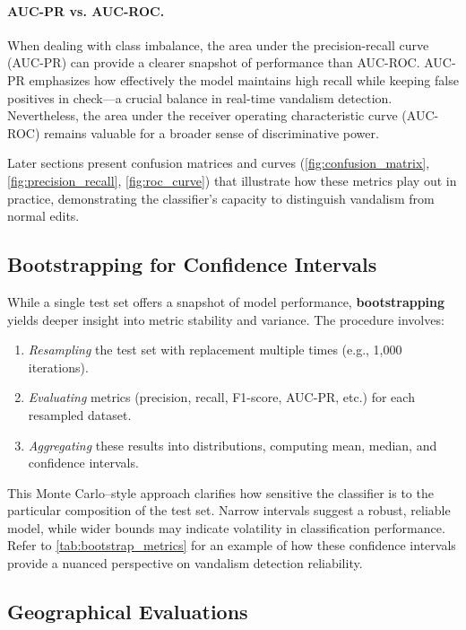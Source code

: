\documentclass[
    13pt, %
    a4paper, %
    DIV14, %
    listof=totoc, %
    bibliography=totoc, %
    index=totoc, %
    headsepline
]{scrreprt}
\begin{document}
\paragraph{AUC-PR vs. AUC-ROC.}
\noindent
When dealing with class imbalance, the area under the precision-recall curve (AUC-PR) can provide a clearer snapshot of performance than AUC-ROC. AUC-PR emphasizes how effectively the model maintains high recall while keeping false positives in check—a crucial balance in real-time vandalism detection. Nevertheless, the area under the receiver operating characteristic curve (AUC-ROC) remains valuable for a broader sense of discriminative power.

\noindent
Later sections present confusion matrices and curves (\autoref{fig:confusion_matrix}, \autoref{fig:precision_recall}, \autoref{fig:roc_curve}) that illustrate how these metrics play out in practice, demonstrating the classifier’s capacity to distinguish vandalism from normal edits.

\subsection{Bootstrapping for Confidence Intervals}
\label{sec:bootstrapping_for_ci}

While a single test set offers a snapshot of model performance, \textbf{bootstrapping} yields deeper insight into metric stability and variance. The procedure involves:
\begin{enumerate}
    \item \emph{Resampling} the test set with replacement multiple times (e.g., 1,000 iterations).
    \item \emph{Evaluating} metrics (precision, recall, F1-score, AUC-PR, etc.) for each resampled dataset.
    \item \emph{Aggregating} these results into distributions, computing mean, median, and confidence intervals.
\end{enumerate}
This Monte Carlo–style approach clarifies how sensitive the classifier is to the particular composition of the test set. Narrow intervals suggest a robust, reliable model, while wider bounds may indicate volatility in classification performance. Refer to \autoref{tab:bootstrap_metrics} for an example of how these confidence intervals provide a nuanced perspective on vandalism detection reliability.

\subsection{Geographical Evaluations}
\label{sec:geographical_evaluations}
\end{document}

